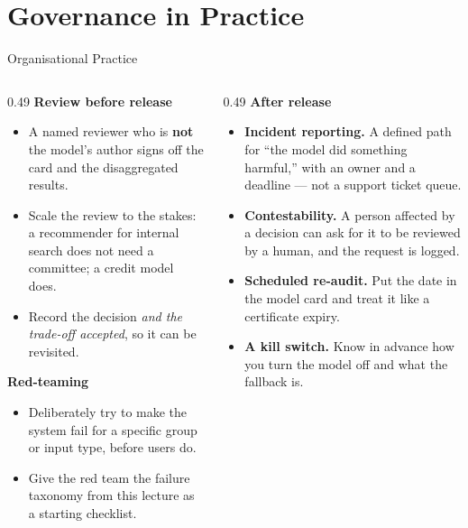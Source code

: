 \section{Governance in Practice}

\begin{frame}{Organisational Practice}

    \begin{columns}[T]
        \begin{column}{0.49\textwidth}
            \textbf{Review before release}
            \begin{itemize}\small
                \setlength\itemsep{0.3em}
                \item A named reviewer who is \textbf{not} the model's author signs off the card
                      and the disaggregated results.
                \item Scale the review to the stakes: a recommender for internal search does not
                      need a committee; a credit model does.
                \item Record the decision \emph{and the trade-off accepted}, so it can be revisited.
            \end{itemize}

            \vspace{0.7em}
            \textbf{Red-teaming}
            \begin{itemize}\small
                \setlength\itemsep{0.3em}
                \item Deliberately try to make the system fail for a specific group or input type,
                      before users do.
                \item Give the red team the failure taxonomy from this lecture as a starting
                      checklist.
            \end{itemize}
        \end{column}
        \begin{column}{0.49\textwidth}
            \textbf{After release}
            \begin{itemize}\small
                \setlength\itemsep{0.3em}
                \item \textbf{Incident reporting.} A defined path for ``the model did something
                      harmful,'' with an owner and a deadline --- not a support ticket queue.
                \item \textbf{Contestability.} A person affected by a decision can ask for it to be
                      reviewed by a human, and the request is logged.
                \item \textbf{Scheduled re-audit.} Put the date in the model card and treat it like
                      a certificate expiry.
                \item \textbf{A kill switch.} Know in advance how you turn the model off and what
                      the fallback is.
            \end{itemize}
        \end{column}
    \end{columns}


\end{frame}
